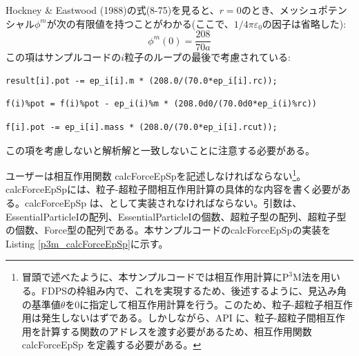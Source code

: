 Hockney \& Eastwood (1988)の式(8-75)を見ると、$r=0$のとき、メッシュポテンシャル$\phi^{m}$が次の有限値を持つことがわかる(ここで、$1/4\pi\varepsilon_{0}$の因子は省略した):
\begin{equation}
\phi^{m}(0) = \dfrac{208}{70a}
\end{equation}
この項はサンプルコードの$i$粒子のループの最後で考慮されている:
\ifCpp
\begin{lstlisting}
result[i].pot -= ep_i[i].m * (208.0/(70.0*ep_i[i].rc));
\end{lstlisting}
\endifCpp
\ifFtn
\begin{lstlisting}
f(i)%pot = f(i)%pot - ep_i(i)%m * (208.0d0/(70.0d0*ep_i(i)%rc))
\end{lstlisting}
\endifFtn
\ifC
\begin{lstlisting}
f[i].pot -= ep_i[i].mass * (208.0/(70.0*ep_i[i].rcut));
\end{lstlisting}
\endifC

この項を考慮しないと解析解と一致しないことに注意する必要がある。

 \label{subsubsubsec:p3m_calcForceEpSp}
ユーザーは相互作用関数 calcForceEpSpを記述しなければならない\footnote{冒頭で述べたように、本サンプルコードでは相互作用計算に$\mathrm{P^{3}M}$法を用いる。FDPSの枠組み内で、これを実現するため、後述するように、見込み角の基準値$\theta$を0に指定して相互作用計算を行う。このため、粒子-超粒子相互作用は発生しないはずである。しかしながら、API に、粒子-超粒子間相互作用を計算する関数のアドレスを渡す必要があるため、相互作用関数 calcForceEpSp を定義する必要がある。}。calcForceEpSpには、粒子-超粒子間相互作用計算の具体的な内容を書く必要がある。calcForceEpSp は、\procedure {}として実装されなければならない。引数は、EssentialParticleIの配列、EssentialParticleIの個数、超粒子型の配列、超粒子型の個数、Force型の配列である。本サンプルコードのcalcForceEpSpの実装をListing \ref{p3m_calcForceEpSp}に示す。

\ifCpp %

\endifCpp
\ifFtn %

\endifFtn
\ifC %

\endifC


